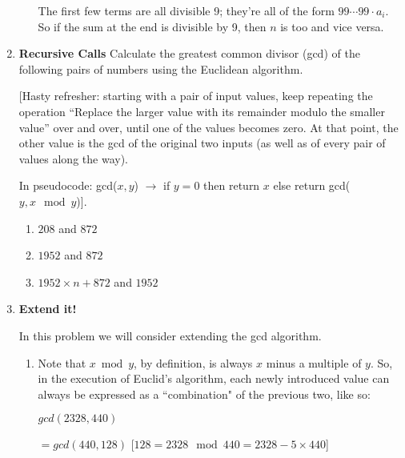 \documentclass[11pt]{article}
\newif\ifsolutions
\begin{document}
\begin{enumerate}
\begin{enumerate}
       The first few terms are all divisible 9; they're all of the form $99\cdots 99 \cdot a_i$.
       So if the sum at the end is divisible by 9, then $n$ is too and vice versa. 
\end{enumerate}
\fi

\item {\bf Recursive Calls}  Calculate the greatest common divisor (gcd) of the following pairs of numbers using the Euclidean algorithm.

[Hasty refresher: starting with a pair of input values, keep repeating the operation ``Replace the larger value with its remainder modulo the smaller value'' over and over, until one of the values becomes zero. At that point, the other value is the gcd of the original two inputs (as well as of every pair of values along the way).

In pseudocode: gcd($x, y$) $\rightarrow$ if $y = 0$ then return $x$ else return gcd($y, x\mod y$)].

\begin{enumerate}
\item $208$ and $872$
\item $1952$ and $872$
\item $1952 \times n + 872$ and $1952$
\end{enumerate}

\ifsolutions
\textbf{Motivation for Problem:} This is supposed to be a quick refresher for the gcd algorithm, and attempts to show how gcd creates recursive calls of other gcd that we can use to shortcut.

\textbf{Solutions:} 8 for all of these. The first answer students should calculate by hand, the second answer will reduce to the first after one step, and the third answer will reduce to the second in one step.  \fi

\item {\bf Extend it!}

In this problem we will consider extending the gcd algorithm.

\begin{enumerate}

\item Note that $x \bmod y$, by definition, is always $x$ minus a multiple of $y$. So, in the execution of Euclid's algorithm, each newly introduced value can always be expressed as a ``combination" of the previous two, like so:

$ gcd(2328, 440)$ 

$= gcd(440, 128)$ [$128 = 2328 \mod{440} = 2328 - 5 \times 440$] 


\end{enumerate}
\end{enumerate}
\end{document}
